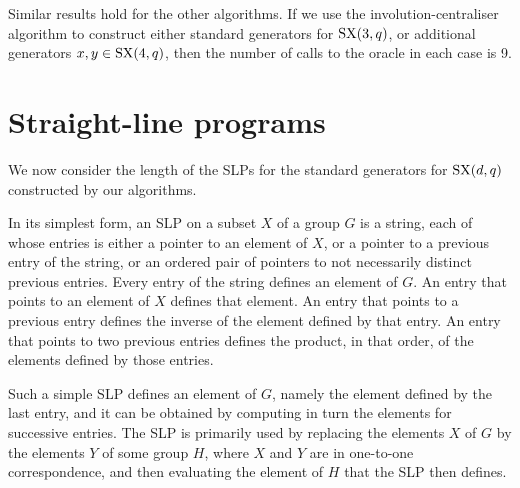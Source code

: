 \documentclass[12pt]{article}
\def\SX{{\rm SX}}
\begin{document}
Similar results hold for the other algorithms.
If we use the involution-centraliser algorithm \cite{Ryba-paper} 
to construct either standard generators for $\SX(3, q)$, 
or additional generators $x, y \in \SX(4, q)$, 
then the number of calls to the oracle in each case is 9.

\section{Straight-line programs}\label{SLP}
We now consider the length of the SLPs for the 
standard generators for $\SX(d, q)$ constructed by our algorithms.

In its simplest form, 
an SLP on a subset $X$ of a group $G$ is a
string, each of whose entries is either a pointer to an element of $X$, 
or a pointer to a previous
entry of the string, or an ordered pair of pointers to not necessarily 
distinct previous entries.
Every entry of the string defines an element of $G$.  An 
entry that points to an element of
$X$ defines that element.  An entry that points to a previous entry defines 
the inverse of the element defined by that entry.  An entry that points to 
two previous entries defines the
product, in that order, of the elements defined by those entries.

Such a simple SLP defines an element 
of $G$, namely the element defined by the last entry, and it 
can be obtained by computing in turn
the elements for successive entries.
The SLP is primarily used by replacing the elements 
$X$ of $G$ by the elements $Y$ of some group
$H$, where $X$ and $Y$ are in one-to-one correspondence, and then evaluating 
the element of $H$ that the SLP then defines.
\end{document}
